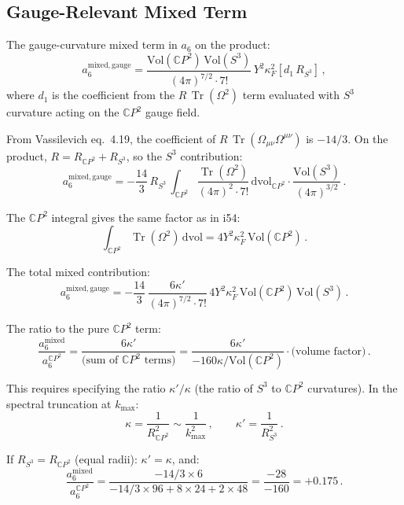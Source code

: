 \documentclass[11pt,a4paper]{article}
\newcommand{\Tr}{\operatorname{Tr}}
\newcommand{\CP}{\mathbb{C}P}
\begin{document}
\subsection{Gauge-Relevant Mixed Term}

The gauge-curvature mixed term in $a_6$ on the product:
\begin{equation}
a_6^{\mathrm{mixed,gauge}} = \frac{\mathrm{Vol}(\CP^2)\,\mathrm{Vol}(S^3)}{(4\pi)^{7/2}\cdot 7!}\,Y^2\kappa_F^2\left[d_1\,R_{S^3}\right]\,,
\end{equation}
where $d_1$ is the coefficient from the $R\,\Tr(\Omega^2)$ term evaluated with $S^3$ curvature acting on the $\CP^2$ gauge field.

From Vassilevich eq.~4.19, the coefficient of $R\,\Tr(\Omega_{\mu\nu}\Omega^{\mu\nu})$ is $-14/3$. On the product, $R = R_{\CP^2} + R_{S^3}$, so the $S^3$ contribution:
\begin{equation}
a_6^{\mathrm{mixed,gauge}} = -\frac{14}{3}\,R_{S^3}\,\int_{\CP^2}\frac{\Tr(\Omega^2)}{(4\pi)^2\cdot 7!}\,\mathrm{dvol}_{\CP^2} \cdot \frac{\mathrm{Vol}(S^3)}{(4\pi)^{3/2}}\,.
\end{equation}

The $\CP^2$ integral gives the same factor as in i54:
\begin{equation}
\int_{\CP^2}\Tr(\Omega^2)\,\mathrm{dvol} = 4Y^2\kappa_F^2\,\mathrm{Vol}(\CP^2)\,.
\end{equation}

The total mixed contribution:
\begin{equation}
a_6^{\mathrm{mixed,gauge}} = -\frac{14}{3}\,\frac{6\kappa'}{(4\pi)^{7/2}\cdot 7!}\,4Y^2\kappa_F^2\,\mathrm{Vol}(\CP^2)\,\mathrm{Vol}(S^3)\,.
\end{equation}

The ratio to the pure $\CP^2$ term:
\begin{equation}
\frac{a_6^{\mathrm{mixed}}}{a_6^{\CP^2}} = \frac{6\kappa'}{\text{(sum of $\CP^2$ terms)}} = \frac{6\kappa'}{-160\kappa/\mathrm{Vol}(\CP^2)} \cdot \text{(volume factor)}\,.
\end{equation}

This requires specifying the ratio $\kappa'/\kappa$ (the ratio of $S^3$ to $\CP^2$ curvatures). In the spectral truncation at $k_{\max}$:
\begin{equation}
\kappa = \frac{1}{R_{\CP^2}^2} \sim \frac{1}{k_{\max}^2}\,,\qquad \kappa' = \frac{1}{R_{S^3}^2}\,.
\end{equation}

If $R_{S^3} = R_{\CP^2}$ (equal radii): $\kappa' = \kappa$, and:
\begin{equation}
\frac{a_6^{\mathrm{mixed}}}{a_6^{\CP^2}} = \frac{-14/3 \times 6}{-14/3 \times 96 + 8 \times 24 + 2 \times 48} = \frac{-28}{-160} = +0.175\,.
\end{equation}
\end{document}

